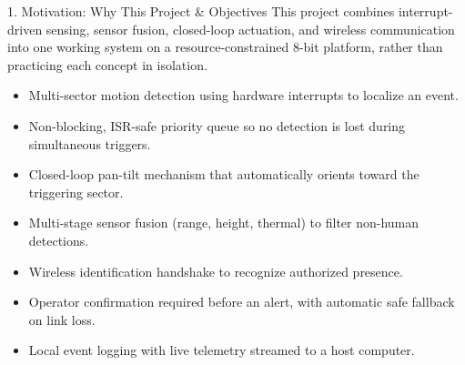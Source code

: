 \documentclass[aspectratio=169, 10pt]{beamer}
\begin{document}
\begin{frame}{1. Motivation: Why This Project \& Objectives}
    \small
    This project combines interrupt-driven sensing, sensor fusion, closed-loop actuation, and wireless communication into one working system on a resource-constrained 8-bit platform, rather than practicing each concept in isolation.
    \vspace{0.25cm}
    \begin{itemize}
        \small
        \item Multi-sector motion detection using hardware interrupts to localize an event.
        \item Non-blocking, ISR-safe priority queue so no detection is lost during simultaneous triggers.
        \item Closed-loop pan-tilt mechanism that automatically orients toward the triggering sector.
        \item Multi-stage sensor fusion (range, height, thermal) to filter non-human detections.
        \item Wireless identification handshake to recognize authorized presence.
        \item Operator confirmation required before an alert, with automatic safe fallback on link loss.
        \item Local event logging with live telemetry streamed to a host computer.
    \end{itemize}
\end{frame}
\end{document}
